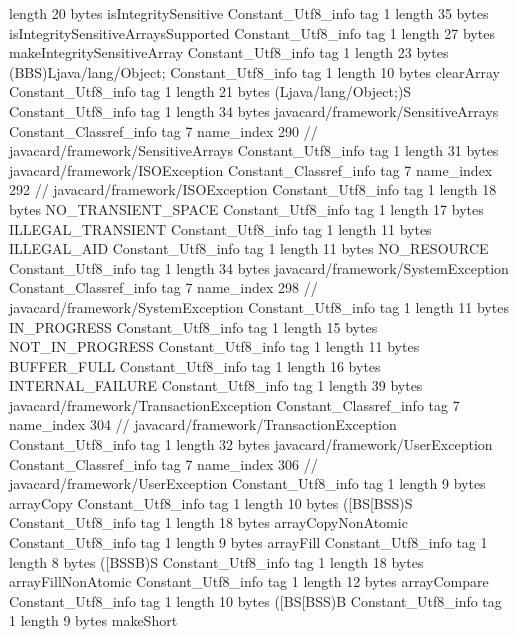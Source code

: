 {{{			length	20
			bytes	isIntegritySensitive
		}
		Constant_Utf8_info {
			tag	1
			length	35
			bytes	isIntegritySensitiveArraysSupported
		}
		Constant_Utf8_info {
			tag	1
			length	27
			bytes	makeIntegritySensitiveArray
		}
		Constant_Utf8_info {
			tag	1
			length	23
			bytes	(BBS)Ljava/lang/Object;
		}
		Constant_Utf8_info {
			tag	1
			length	10
			bytes	clearArray
		}
		Constant_Utf8_info {
			tag	1
			length	21
			bytes	(Ljava/lang/Object;)S
		}
		Constant_Utf8_info {
			tag	1
			length	34
			bytes	javacard/framework/SensitiveArrays
		}
		Constant_Classref_info {
			tag	7
			name_index	290		// javacard/framework/SensitiveArrays
		}
		Constant_Utf8_info {
			tag	1
			length	31
			bytes	javacard/framework/ISOException
		}
		Constant_Classref_info {
			tag	7
			name_index	292		// javacard/framework/ISOException
		}
		Constant_Utf8_info {
			tag	1
			length	18
			bytes	NO_TRANSIENT_SPACE
		}
		Constant_Utf8_info {
			tag	1
			length	17
			bytes	ILLEGAL_TRANSIENT
		}
		Constant_Utf8_info {
			tag	1
			length	11
			bytes	ILLEGAL_AID
		}
		Constant_Utf8_info {
			tag	1
			length	11
			bytes	NO_RESOURCE
		}
		Constant_Utf8_info {
			tag	1
			length	34
			bytes	javacard/framework/SystemException
		}
		Constant_Classref_info {
			tag	7
			name_index	298		// javacard/framework/SystemException
		}
		Constant_Utf8_info {
			tag	1
			length	11
			bytes	IN_PROGRESS
		}
		Constant_Utf8_info {
			tag	1
			length	15
			bytes	NOT_IN_PROGRESS
		}
		Constant_Utf8_info {
			tag	1
			length	11
			bytes	BUFFER_FULL
		}
		Constant_Utf8_info {
			tag	1
			length	16
			bytes	INTERNAL_FAILURE
		}
		Constant_Utf8_info {
			tag	1
			length	39
			bytes	javacard/framework/TransactionException
		}
		Constant_Classref_info {
			tag	7
			name_index	304		// javacard/framework/TransactionException
		}
		Constant_Utf8_info {
			tag	1
			length	32
			bytes	javacard/framework/UserException
		}
		Constant_Classref_info {
			tag	7
			name_index	306		// javacard/framework/UserException
		}
		Constant_Utf8_info {
			tag	1
			length	9
			bytes	arrayCopy
		}
		Constant_Utf8_info {
			tag	1
			length	10
			bytes	([BS[BSS)S
		}
		Constant_Utf8_info {
			tag	1
			length	18
			bytes	arrayCopyNonAtomic
		}
		Constant_Utf8_info {
			tag	1
			length	9
			bytes	arrayFill
		}
		Constant_Utf8_info {
			tag	1
			length	8
			bytes	([BSSB)S
		}
		Constant_Utf8_info {
			tag	1
			length	18
			bytes	arrayFillNonAtomic
		}
		Constant_Utf8_info {
			tag	1
			length	12
			bytes	arrayCompare
		}
		Constant_Utf8_info {
			tag	1
			length	10
			bytes	([BS[BSS)B
		}
		Constant_Utf8_info {
			tag	1
			length	9
			bytes	makeShort
}}}
